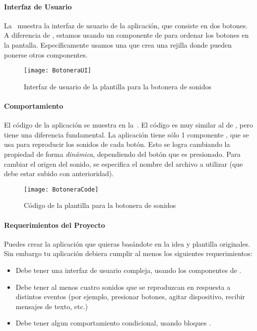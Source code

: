 \paragraph{Interfaz de Usuario}

La~ muestra la interfaz de usuario de la
aplicación, que consiste en dos botones. A diferencia de , estamos usando un componente de 
para ordenar los botones en la pantalla. Específicamente usamos una
 que crea una rejilla donde pueden
ponerse otros componentes.

\begin{figure}[H]
\centering
\texttt{[image: BotoneraUI]}
\caption{Interfaz de usuario de la plantilla para la botonera de sonidos}
\label{fig:botoneraUI}
\end{figure}

\paragraph{Comportamiento}

El código de la aplicación se muestra en
la~. El código es muy similar al de
, pero tiene una diferencia fundamental. La
aplicación tiene sólo 1 componente , que se usa para
reproducir los sonidos de cada botón. Esto se logra cambiando la
propiedad  de forma \emph{dinámica}, dependiendo del
botón que es presionado. Para cambiar el origen del sonido, se
especifica el nombre del archivo a utilizar (que debe estar subido con
anterioridad).

\begin{figure}[H]
\centering
\texttt{[image: BotoneraCode]}
\caption{Código de la plantilla para la botonera de sonidos}
\label{fig:botoneraCode}
\end{figure}

\paragraph{Requerimientos del Proyecto}

Puedes crear la aplicación que quieras basándote en la idea y
plantilla originales. Sin embargo tu aplicación debiera cumplir al
menos los siguientes requerimientos:

\begin{itemize}

\item Debe tener una interfaz de usuario compleja, usando los
  componentes de .

\item Debe tener al menos cuatro sonidos que se reproduzcan en
  respuesta a distintos eventos (por ejemplo, presionar botones,
  agitar dispositivo, recibir mensajes de texto, etc.)

\item Debe tener algun comportamiento condicional, usando bloques
  .

\end{itemize}

